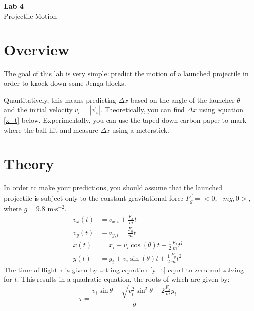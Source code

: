 \documentclass{article}
\begin{document}
\fancyfoot[C]{\thepage}
\vspace*{0cm}
\begin{center}
	{\LARGE \textbf{Lab 4}}\\
	\vspace{.25cm}
	{\Large Projectile Motion}
\end{center}

\section*{Overview}
The goal of this lab is very simple: predict the motion of a launched projectile in order to knock down some Jenga blocks.

Quantitatively, this means predicting $\Delta x$ based on the angle of the launcher $\theta$ and the initial velocity $v_i=|\vec{v}_i|$. Theoretically, you can find $\Delta x$ using equation \ref{x_t} below. Experimentally, you can use the taped down carbon paper to mark where the ball hit and measure $\Delta x$ using a meterstick.
\section*{Theory}
In order to make your predictions, you should assume that the launched projectile is subject only to the constant gravitational force $\vec{F_g}=<0,-mg,0>$, where $g=9.8$ m$\cdot$s$^{-2}$.
\begin{align}
v_x(t)&=v_{x,i}+\frac{F_x}{m}t\\
v_y(t)&=v_{y,i}+\frac{F_y}{m}t\\
\label{x_t} x(t)&=x_i+v_i\cos({\theta})t+\frac{1}{2}\frac{F_x}{m}t^2\\
\label{y_t}y(t)&=y_i+v_i\sin({\theta})t+\frac{1}{2}\frac{F_y}{m}t^2
\end{align}
The time of flight $\tau$ is given by setting equation \ref{y_t} equal to zero and solving for $t$. This results in a quadratic equation, the roots of which are given by:
\begin{equation}
\tau=\frac{v_i\sin{\theta}+\sqrt{v_i^2\sin^2{\theta}-2\frac{F_y}{m}y_i }}{g}
\label{tof}
\end{equation}
\end{document}
